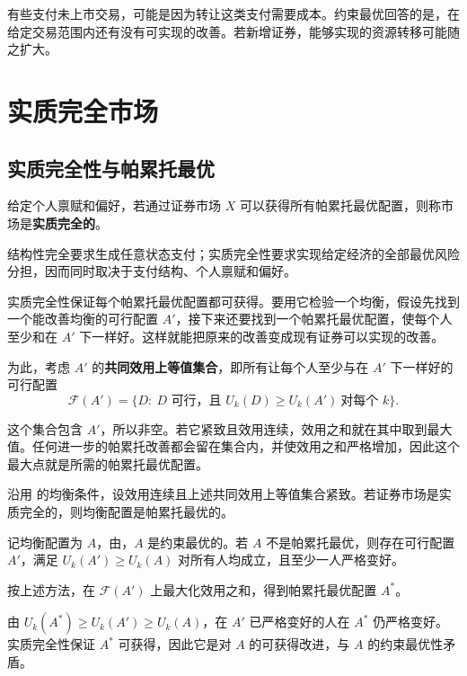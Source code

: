 有些支付未上市交易，可能是因为转让这类支付需要成本。约束最优回答的是，在给定交易范围内还有没有可实现的改善。若新增证券，能够实现的资源转移可能随之扩大。

\section{实质完全市场}\label{sec:wj-eleven-3}
\subsection{实质完全性与帕累托最优}
\begin{tcolorbox}[knowledge]
 给定个人禀赋和偏好，若通过证券市场 $X$ 可以获得所有帕累托最优配置，则称市场是\textbf{实质完全的}。
\end{tcolorbox}

结构性完全要求生成任意状态支付；实质完全性要求实现给定经济的全部最优风险分担，因而同时取决于支付结构、个人禀赋和偏好。

实质完全性保证每个帕累托最优配置都可获得。要用它检验一个均衡，假设先找到一个能改善均衡的可行配置 $A'$，接下来还要找到一个帕累托最优配置，使每个人至少和在 $A'$ 下一样好。这样就能把原来的改善变成现有证券可以实现的改善。

为此，考虑 $A'$ 的\textbf{共同效用上等值集合}，即所有让每个人至少与在 $A'$ 下一样好的可行配置
\[
 \mathcal F(A')=\{D:\ D\text{ 可行，且 }U_k(D)\ge U_k(A')\ \text{对每个 }k\}.
\]

这个集合包含 $A'$，所以非空。若它紧致且效用连续，效用之和就在其中取到最大值。任何进一步的帕累托改善都会留在集合内，并使效用之和严格增加，因此这个最大点就是所需的帕累托最优配置。

\begin{tcolorbox}[knowledge]
 沿用 的均衡条件，设效用连续且上述共同效用上等值集合紧致。若证券市场是实质完全的，则均衡配置是帕累托最优的。
\end{tcolorbox}

\begin{solution}[label-content={证明},blank-type=none]
记均衡配置为 $A$，由，$A$ 是约束最优的。若 $A$ 不是帕累托最优，则存在可行配置 $A'$，满足 $U_k(A')\ge U_k(A)$ 对所有人均成立，且至少一人严格变好。

按上述方法，在 $\mathcal F(A')$ 上最大化效用之和，得到帕累托最优配置 $A^*$。

由 $U_k(A^*)\ge U_k(A')\ge U_k(A)$，在 $A'$ 已严格变好的人在 $A^*$ 仍严格变好。实质完全性保证 $A^*$ 可获得，因此它是对 $A$ 的可获得改进，与 $A$ 的约束最优性矛盾。
\end{solution}

